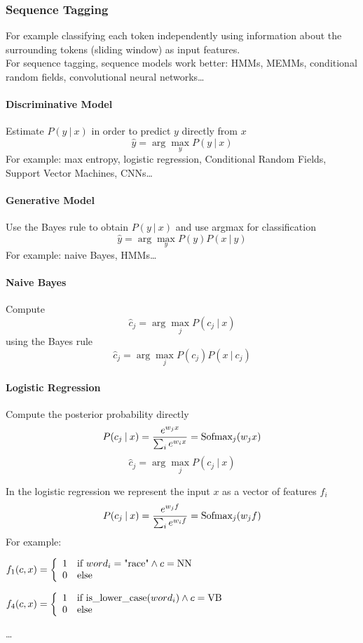 \documentclass[10pt]{report}
\begin{document}
\subsubsection{Sequence Tagging} For example classifying each token independently using information about the surrounding tokens (sliding window) as input features.\\
For sequence tagging, sequence models work better: HMMs, MEMMs, conditional random fields, convolutional neural networks\ldots
\paragraph{Discriminative Model} Estimate $P(y\:|\:x)$ in order to predict $y$ directly from $x$
$$\hat{y}=\arg\max_y P(y\:|\:x)$$
For example: max entropy, logistic regression, Conditional Random Fields, Support Vector Machines, CNNs\ldots
\paragraph{Generative Model} Use the Bayes rule to obtain $P(y\:|\:x)$ and use argmax for classification
$$\hat{y} = \arg\max_y P(y)P(x\:|\:y)$$
For example: naive Bayes, HMMs\ldots
\begin{multicols}{2}
\paragraph{Naive Bayes} Compute $$\hat{c}_j=\arg\max_j P(c_j\:|\:x)$$ using the Bayes rule $$\hat{c}_j = \arg\max_j P(c_j)P(x\:|\:c_j)$$
\columnbreak
\paragraph{Logistic Regression} Compute the posterior probability directly
$$P(c_j\:|\:x) = \frac{e^{w_jx}}{\sum_ie^{w_ix}}=\hbox{Sofmax}_j(w_jx)$$
$$\hat{c}_j = \arg\max_j P(c_j\:|\:x)$$
\end{multicols}
In the logistic regression we represent the input $x$ as a vector of features $f_i$
$$P(c_j\:|\:x) = \frac{e^{w_jf}}{\sum_ie^{w_if}}=\hbox{Sofmax}_j(w_jf)$$
For example:\begin{list}{}{}
	\item $f_1(c,x)=\left\{\begin{array}{l l}
	1&\hbox{if }word_i=\hbox{"race"}\wedge c=\hbox{NN}\\
	0&\hbox{else}
	\end{array}\right.$
	\item $f_4(c,x)=\left\{\begin{array}{l l}
	1&\hbox{if is\_lower\_case(}word_i\hbox{)}\wedge c= \hbox{VB}\\
	0&\hbox{else}
	\end{array}\right.$
	\item \ldots
\end{list}
\end{document}
